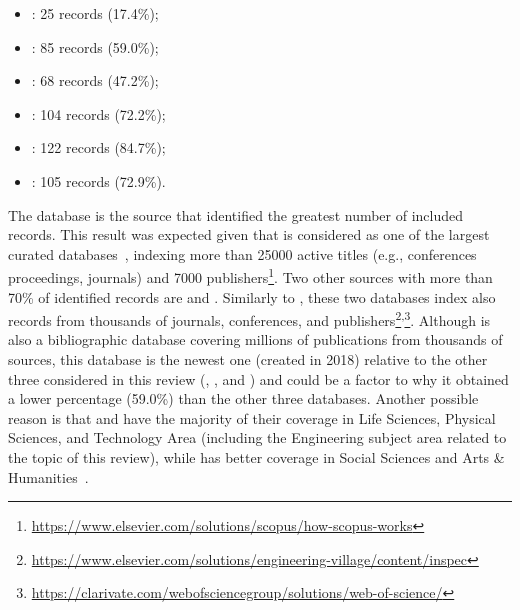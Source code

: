 \begin{itemize}[nosep]
\item {}: 25 records (17.4\%);
\item {}: 85 records (59.0\%);
\item {}: 68 records (47.2\%);
\item {}: 104 records (72.2\%);
\item {}: 122 records (84.7\%);
\item {}: 105 records (72.9\%).
\end{itemize}

The database  is the source that identified the greatest number of included records. This result was expected given that  is considered as one of the largest curated databases~\parencite{methodology:search:db:coverage:dim-scopus-wos}, indexing more than 25000 active titles (e.g., conferences proceedings, journals) and 7000 publishers\footnote{\url{https://www.elsevier.com/solutions/scopus/how-scopus-works}}.
Two other sources with more than 70\% of identified records are  and . Similarly to , these two databases index also records from thousands of journals, conferences, and publishers\footnote{\url{https://www.elsevier.com/solutions/engineering-village/content/inspec}}\textsuperscript{,}\footnote{\url{https://clarivate.com/webofsciencegroup/solutions/web-of-science/}}.
Although  is also a bibliographic database covering millions of publications from thousands of sources, this database is the newest one (created in 2018) relative to the other three considered in this review (, , and ) and could be a factor to why it obtained a lower percentage (59.0\%) than the other three databases. Another possible reason is that  and  have the majority of their coverage in Life Sciences, Physical Sciences, and Technology Area (including the Engineering subject area related to the topic of this review), while  has better coverage in Social Sciences and Arts \& Humanities~\parencite{methodology:search:db:coverage:dim-scopus-wos}.
